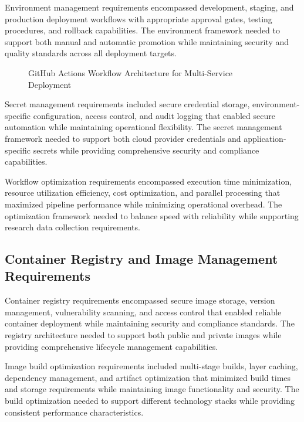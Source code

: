 Environment management requirements encompassed development, staging, and production deployment workflows with appropriate approval gates, testing procedures, and rollback capabilities. The environment framework needed to support both manual and automatic promotion while maintaining security and quality standards across all deployment targets.

\begin{figure}[H]
\centering
\caption{GitHub Actions Workflow Architecture for Multi-Service Deployment}
\label{fig:github-actions-workflow}
\end{figure}

Secret management requirements included secure credential storage, environment-specific configuration, access control, and audit logging that enabled secure automation while maintaining operational flexibility. The secret management framework needed to support both cloud provider credentials and application-specific secrets while providing comprehensive security and compliance capabilities.

Workflow optimization requirements encompassed execution time minimization, resource utilization efficiency, cost optimization, and parallel processing that maximized pipeline performance while minimizing operational overhead. The optimization framework needed to balance speed with reliability while supporting research data collection requirements.

\subsection{Container Registry and Image Management Requirements}

Container registry requirements encompassed secure image storage, version management, vulnerability scanning, and access control that enabled reliable container deployment while maintaining security and compliance standards. The registry architecture needed to support both public and private images while providing comprehensive lifecycle management capabilities.

Image build optimization requirements included multi-stage builds, layer caching, dependency management, and artifact optimization that minimized build times and storage requirements while maintaining image functionality and security. The build optimization needed to support different technology stacks while providing consistent performance characteristics.

